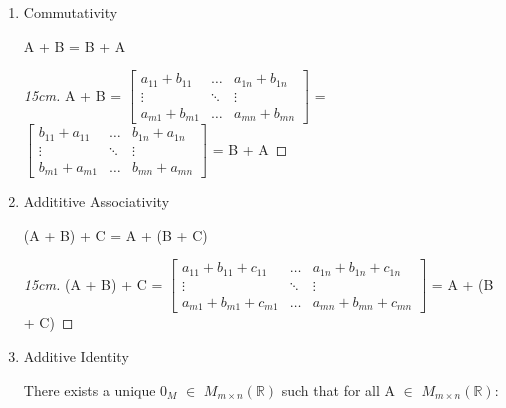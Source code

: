     \begin{enumerate}[label=(\alph*), leftmargin=2cm, itemsep=0.1cm]
        \item {\color{lgreen} Commutativity}
        
            \hspace{0.5cm}
            A + B = B + A

            \begin{proof}[15cm]
                A + B =
                $\begin{bmatrix}
                    a_{11}+b_{11} & \hdots & a_{1n}+b_{1n} \\
                    \vdots  & \ddots & \vdots \\
                    a_{m1}+b_{m1} & \hdots & a_{mn}+b_{mn}
                \end{bmatrix}$ =
                $\begin{bmatrix}
                    b_{11}+a_{11} & \hdots & b_{1n}+a_{1n} \\
                    \vdots & \ddots & \vdots \\
                    b_{m1}+a_{m1} & \hdots & b_{mn}+a_{mn}
                \end{bmatrix}$
                = B + A
            \end{proof}

            \newpage

        \item {\color{lgreen} Addititive Associativity}
        
            \hspace{0.5cm}
            (A + B) + C = A + (B + C)

            \begin{proof}[15cm]
                (A + B) + C =
                $\begin{bmatrix}
                    a_{11}+b_{11}+c_{11} & \hdots & a_{1n}+b_{1n}+c_{1n} \\
                    \vdots  & \ddots & \vdots \\
                    a_{m1}+b_{m1}+c_{m1} & \hdots & a_{mn}+b_{mn}+c_{mn}
                \end{bmatrix}$ = A + (B + C)
            \end{proof}

        \item {\color{lgreen} Additive Identity}
        
            There exists a unique $0_M$ $\in$ $M_{m \times n}(\mathbb{R})$
            such that for all A $\in$ $M_{m \times n}(\mathbb{R})$:


\end{enumerate}
